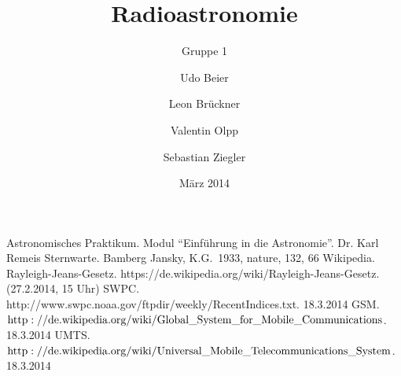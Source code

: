 
%
%


\title{Radioastronomie}
\subtitle{Gruppe 1}
\date{März 2014}
\author{Udo Beier \and Leon Brückner \and Valentin Olpp \and Sebastian Ziegler}

\maketitle
\tableofcontents
\newpage
\listoffigures
\listoftables
\newpage

\newpage






%
\newpage
%
%
%
\begin{thebibliography}{9}
 Astronomisches Praktikum. Modul \enquote{Einführung in die Astronomie}. Dr. Karl Remeis Sternwarte. Bamberg
 Jansky, K.G.\ 1933, nature, 132, 66 
 Wikipedia. Rayleigh-Jeans-Gesetz. https://de.wikipedia.org/wiki/Rayleigh-Jeans-Gesetz. (27.2.2014, 15 Uhr)
 SWPC. http://www.swpc.noaa.gov/ftpdir/weekly/RecentIndices.txt. 18.3.2014
 GSM. $\mathrm{http://de.wikipedia.org/wiki/Global\_System\_for\_Mobile\_Communications}$. 18.3.2014
 UMTS. $\mathrm{http://de.wikipedia.org/wiki/Universal\_Mobile\_Telecommunications\_System}$. 18.3.2014 
\end{thebibliography}
